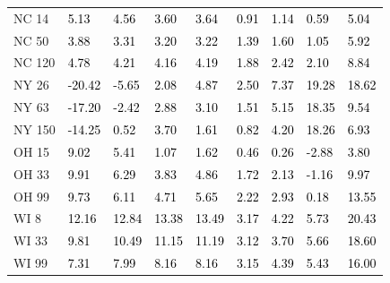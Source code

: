 \begin{tabular}{lllllllll}
NC 14 & \textcolor{black}{ 5.13 } & \textcolor{black}{ 4.56 } & \textcolor{black}{ 3.60 } & \textcolor{black}{ 3.64 } & \textcolor{black}{ 0.91 } & \textcolor{black}{ 1.14 } & \textcolor{black}{ 0.59 } & \textcolor{black}{ 5.04 } \\
NC 50 & \textcolor{black}{ 3.88 } & \textcolor{black}{ 3.31 } & \textcolor{black}{ 3.20 } & \textcolor{black}{ 3.22 } & \textcolor{black}{ 1.39 } & \textcolor{black}{ 1.60 } & \textcolor{black}{ 1.05 } & \textcolor{black}{ 5.92 } \\
NC 120 & \textcolor{black}{ 4.78 } & \textcolor{black}{ 4.21 } & \textcolor{black}{ 4.16 } & \textcolor{black}{ 4.19 } & \textcolor{black}{ 1.88 } & \textcolor{black}{ 2.42 } & \textcolor{black}{ 2.10 } & \textcolor{black}{ 8.84 } \\
NY 26 & \textcolor{black}{ -20.42 } & \textcolor{black}{ -5.65 } & \textcolor{black}{ 2.08 } & \textcolor{black}{ 4.87 } & \textcolor{black}{ 2.50 } & \textcolor{black}{ 7.37 } & \textcolor{black}{ 19.28 } & \textcolor{black}{ 18.62 } \\
NY 63 & \textcolor{black}{ -17.20 } & \textcolor{black}{ -2.42 } & \textcolor{black}{ 2.88 } & \textcolor{black}{ 3.10 } & \textcolor{black}{ 1.51 } & \textcolor{black}{ 5.15 } & \textcolor{black}{ 18.35 } & \textcolor{black}{ 9.54 } \\
NY 150 & \textcolor{black}{ -14.25 } & \textcolor{black}{ 0.52 } & \textcolor{black}{ 3.70 } & \textcolor{black}{ 1.61 } & \textcolor{black}{ 0.82 } & \textcolor{black}{ 4.20 } & \textcolor{black}{ 18.26 } & \textcolor{black}{ 6.93 } \\
OH 15 & \textcolor{black}{ 9.02 } & \textcolor{black}{ 5.41 } & \textcolor{black}{ 1.07 } & \textcolor{black}{ 1.62 } & \textcolor{black}{ 0.46 } & \textcolor{black}{ 0.26 } & \textcolor{black}{ -2.88 } & \textcolor{black}{ 3.80 } \\
OH 33 & \textcolor{black}{ 9.91 } & \textcolor{black}{ 6.29 } & \textcolor{black}{ 3.83 } & \textcolor{black}{ 4.86 } & \textcolor{black}{ 1.72 } & \textcolor{black}{ 2.13 } & \textcolor{black}{ -1.16 } & \textcolor{black}{ 9.97 } \\
OH 99 & \textcolor{black}{ 9.73 } & \textcolor{black}{ 6.11 } & \textcolor{black}{ 4.71 } & \textcolor{black}{ 5.65 } & \textcolor{black}{ 2.22 } & \textcolor{black}{ 2.93 } & \textcolor{black}{ 0.18 } & \textcolor{black}{ 13.55 } \\
WI 8 & \textcolor{black}{ 12.16 } & \textcolor{black}{ 12.84 } & \textcolor{black}{ 13.38 } & \textcolor{black}{ 13.49 } & \textcolor{black}{ 3.17 } & \textcolor{black}{ 4.22 } & \textcolor{black}{ 5.73 } & \textcolor{black}{ 20.43 } \\
WI 33 & \textcolor{black}{ 9.81 } & \textcolor{black}{ 10.49 } & \textcolor{black}{ 11.15 } & \textcolor{black}{ 11.19 } & \textcolor{black}{ 3.12 } & \textcolor{black}{ 3.70 } & \textcolor{black}{ 5.66 } & \textcolor{black}{ 18.60 } \\
WI 99 & \textcolor{black}{ 7.31 } & \textcolor{black}{ 7.99 } & \textcolor{black}{ 8.16 } & \textcolor{black}{ 8.16 } & \textcolor{black}{ 3.15 } & \textcolor{black}{ 4.39 } & \textcolor{black}{ 5.43 } & \textcolor{black}{ 16.00 } \\
\bottomrule
\end{tabular}
